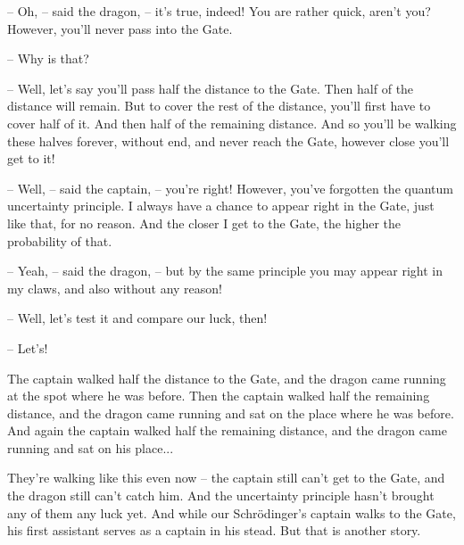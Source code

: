 \documentclass[ebook,oneside,final,openright]{memoir}
\begin{document}
– Oh, – said the dragon, – it’s true, indeed! You are rather quick, aren’t you? However, you’ll never pass into the Gate.\par
– Why is that?\par
– Well, let’s say you’ll pass half the distance to the Gate. Then half of the distance will remain. But to cover the rest of the distance, you’ll first have to cover half of it. And then half of the remaining distance. And so you’ll be walking these halves forever, without end, and never reach the Gate, however close you’ll get to it!\par
– Well, – said the captain, – you’re right! However, you’ve forgotten the quantum uncertainty principle. I always have a chance to appear right in the Gate, just like that, for no reason. And the closer I get to the Gate, the higher the probability of that.\par
– Yeah, – said the dragon, – but by the same principle you may appear right in my claws, and also without any reason!\par
– Well, let’s test it and compare our luck, then!\par
– Let’s!\par
\par
The captain walked half the distance to the Gate, and the dragon came running at the spot where he was before. Then the captain walked half the remaining distance, and the dragon came running and sat on the place where he was before. And again the captain walked half the remaining distance, and the dragon came running and sat on his place...\par
\par
They’re walking like this even now – the captain still can’t get to the Gate, and the dragon still can’t catch him. And the uncertainty principle hasn’t brought any of them any luck yet. And while our Schrödinger’s captain walks to the Gate, his first assistant serves as a captain in his stead. But that is another story.
\end{document}
